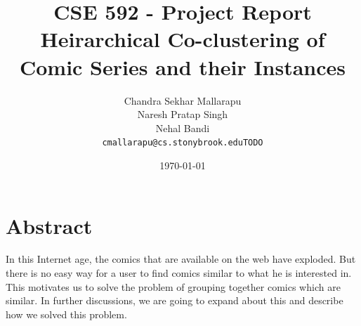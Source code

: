 \documentclass[11pt,twocolumn]{article}
\begin{document}
\title{CSE 592 - Project Report\\
  Heirarchical Co-clustering of Comic Series and their Instances}
\author{
  Chandra Sekhar Mallarapu\\
  Naresh Pratap Singh\\
  Nehal Bandi\\
  \texttt{cmallarapu@cs.stonybrook.eduTODO}}
\date{\today}
\maketitle
\titlepage
\tableofcontents
\listoffigures
\pagebreak

\section{Abstract}
In this Internet age, the comics that are available on the web have exploded. But there is no easy way for a user to find comics similar to what he is interested in. This motivates us to solve the problem of grouping together comics which are similar. In further discussions, we are going to expand about this and describe how we solved this problem.
\end{document}
